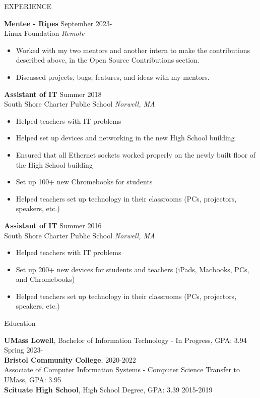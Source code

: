 \documentclass{resume} %
\begin{document}
\begin{rSection}{EXPERIENCE}
	
\textbf{Mentee - Ripes} \hfill September 2023- \\
Linux Foundation \hfill \textit{Remote}
\vspace{-.75em}
\begin{itemize}
	\itemsep -8pt{}
	\item Worked with my two mentors and another intern to make the contributions described above, in the Open Source Contributions section.
	\item Discussed projects, bugs, features, and ideas with my mentors.
\end{itemize}

\vspace{-.75em}
\textbf{Assistant of IT} \hfill Summer 2018 \\
South Shore Charter Public School \hfill \textit{Norwell, MA}
\vspace{-.75em}
 \begin{itemize}
 	\itemsep -8pt{}
     \item Helped teachers with IT problems
     \item Helped set up devices and networking in the new High School building
     \item Ensured that all Ethernet sockets worked properly on the newly built floor of the High School building
     \item Set up 100+ new Chromebooks for students
     \item Helped teachers set up technology in their classrooms (PCs, projectors, speakers, etc.)
 \end{itemize}

\textbf{Assistant of IT} \hfill Summer 2016 \\
South Shore Charter Public School \hfill \textit{Norwell, MA}
 \begin{itemize}
 	\itemsep -8pt{}
     \item Helped teachers with IT problems
     \item Set up 200+ new devices for students and teachers (iPads, Macbooks, PCs, and Chromebooks)
     \item Helped teachers set up technology in their classrooms (PCs, projectors, speakers, etc.)
 \end{itemize}

\end{rSection}

\begin{rSection}{Education}

{\bf UMass Lowell}, Bachelor of Information Technology - In Progress, GPA: 3.94 \hfill {Spring 2023-} \\
{\bf Bristol Community College},  \hfill {2020-2022} \\
Associate of Computer Information Systems - Computer Science Transfer to UMass, GPA: 3.95 \\
{\bf Scituate High School}, High School Degree, GPA: 3.39 \hfill {2015-2019} \\

\end{rSection}
\end{document}
